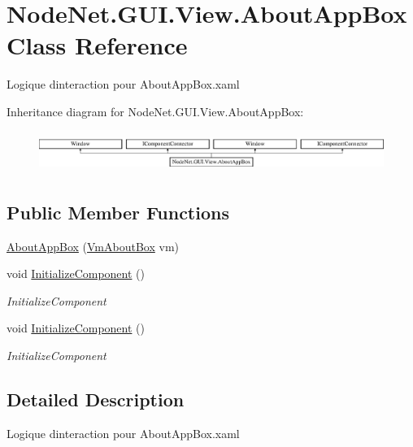 \hypertarget{class_node_net_1_1_g_u_i_1_1_view_1_1_about_app_box}{}\section{Node\+Net.\+G\+U\+I.\+View.\+About\+App\+Box Class Reference}
\label{class_node_net_1_1_g_u_i_1_1_view_1_1_about_app_box}


Logique d\textquotesingle{}interaction pour About\+App\+Box.\+xaml  


Inheritance diagram for Node\+Net.\+G\+U\+I.\+View.\+About\+App\+Box\+:\begin{figure}[H]
\begin{center}
\leavevmode
\includegraphics[height=1.359223cm]{class_node_net_1_1_g_u_i_1_1_view_1_1_about_app_box}
\end{center}
\end{figure}
\subsection*{Public Member Functions}
\begin{DoxyCompactItemize}
\item 
\hyperlink{class_node_net_1_1_g_u_i_1_1_view_1_1_about_app_box_a915ecebc1621a72c817d8b4d114c1176}{About\+App\+Box} (\hyperlink{class_node_net_1_1_g_u_i_1_1_view_model_1_1_vm_about_box}{Vm\+About\+Box} vm)
\item 
void \hyperlink{class_node_net_1_1_g_u_i_1_1_view_1_1_about_app_box_a89a3badd7c39959698500e9592345ed8}{Initialize\+Component} ()
\begin{DoxyCompactList}\small\item\em Initialize\+Component \end{DoxyCompactList}\item 
void \hyperlink{class_node_net_1_1_g_u_i_1_1_view_1_1_about_app_box_a89a3badd7c39959698500e9592345ed8}{Initialize\+Component} ()
\begin{DoxyCompactList}\small\item\em Initialize\+Component \end{DoxyCompactList}\end{DoxyCompactItemize}


\subsection{Detailed Description}
Logique d\textquotesingle{}interaction pour About\+App\+Box.\+xaml 

